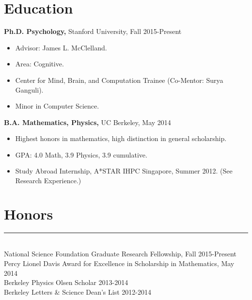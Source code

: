 \documentclass[margin]{res}
\begin{document}
 
 
 
\address{{\bf Address} \\ Department of Psychology \\ Stanford University \\ 450 Serra Mall \\ Stanford, CA 94305}
\address{{\bf Contact Information} \\ lampinen@stanford.edu \\\url{web.stanford.edu/~lampinen}}
\begin{resume} 
\section{Education} 
{\bf Ph.D. Psychology,} Stanford University, Fall 2015-Present
\begin{itemize} \itemsep -2pt \item Advisor: James L. McClelland. \item Area: Cognitive. \item Center for Mind, Brain, and Computation Trainee (Co-Mentor: Surya Ganguli). \item Minor in Computer Science.\end{itemize}
{\bf B.A. Mathematics, Physics,} UC Berkeley, May 2014 \begin{itemize} \itemsep -2pt \item Highest honors in mathematics, high distinction in general scholarship. \item GPA: 4.0 Math, 3.9 Physics, 3.9 cumulative. \item Study Abroad Internship, A*STAR IHPC Singapore, Summer 2012. (See Research Experience.) \end{itemize}
\vspace{1pt}\section{Honors} \vspace{-15pt} \rule{\textwidth}{0.5pt} \\[3pt]
National Science Foundation Graduate Research Fellowship, Fall 2015-Present \\
Percy Lionel Davis Award for Excellence in Scholarship in Mathematics, May 2014 \\ 
Berkeley Physics Olsen Scholar 2013-2014 \\
Berkeley Letters \& Science Dean's List 2012-2014\\

\end{resume}
\end{document}
